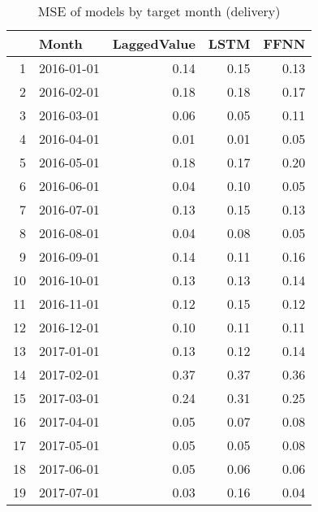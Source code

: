 \begin{table}[ht]
\centering
\begin{tabular}{rlrrr}
  \hline
 & Month & LaggedValue & LSTM & FFNN \\ 
  \hline
1 & 2016-01-01 & 0.14 & 0.15 & 0.13 \\ 
  2 & 2016-02-01 & 0.18 & 0.18 & 0.17 \\ 
  3 & 2016-03-01 & 0.06 & 0.05 & 0.11 \\ 
  4 & 2016-04-01 & 0.01 & 0.01 & 0.05 \\ 
  5 & 2016-05-01 & 0.18 & 0.17 & 0.20 \\ 
  6 & 2016-06-01 & 0.04 & 0.10 & 0.05 \\ 
  7 & 2016-07-01 & 0.13 & 0.15 & 0.13 \\ 
  8 & 2016-08-01 & 0.04 & 0.08 & 0.05 \\ 
  9 & 2016-09-01 & 0.14 & 0.11 & 0.16 \\ 
  10 & 2016-10-01 & 0.13 & 0.13 & 0.14 \\ 
  11 & 2016-11-01 & 0.12 & 0.15 & 0.12 \\ 
  12 & 2016-12-01 & 0.10 & 0.11 & 0.11 \\ 
  13 & 2017-01-01 & 0.13 & 0.12 & 0.14 \\ 
  14 & 2017-02-01 & 0.37 & 0.37 & 0.36 \\ 
  15 & 2017-03-01 & 0.24 & 0.31 & 0.25 \\ 
  16 & 2017-04-01 & 0.05 & 0.07 & 0.08 \\ 
  17 & 2017-05-01 & 0.05 & 0.05 & 0.08 \\ 
  18 & 2017-06-01 & 0.05 & 0.06 & 0.06 \\ 
  19 & 2017-07-01 & 0.03 & 0.16 & 0.04 \\ 
   \hline
\end{tabular}
\caption{MSE of models by target month (delivery)} 
\label{tab:mse_monthly}
\end{table}
